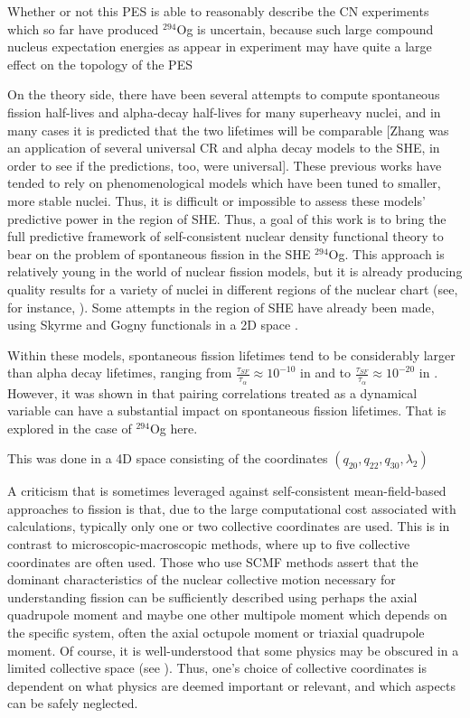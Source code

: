 Whether or not this PES is able to reasonably describe the CN experiments which so far have produced $^{294}$Og is uncertain, because such large compound nucleus expectation energies as appear in experiment may have quite a large effect on the topology of the PES \cite{Pei2009}

On the theory side, there have been several attempts to compute spontaneous fission half-lives and alpha-decay half-lives for many superheavy nuclei, and in many cases it is predicted that the two lifetimes will be comparable \cite{Poenaru2011, Poenaru2012, Zhang2018} [Zhang was an application of several universal CR and alpha decay models to the SHE, in order to see if the predictions, too, were universal]. These previous works have tended to rely on phenomenological models which have been tuned to smaller, more stable nuclei. Thus, it is difficult or impossible to assess these models' predictive power in the region of SHE. Thus, a goal of this work is to bring the full predictive framework of self-consistent nuclear density functional theory to bear on the problem of spontaneous fission in the SHE $^{294}$Og. This approach is relatively young in the world of nuclear fission models, but it is already producing quality results for a variety of nuclei in different regions of the nuclear chart (see, for instance, \cite{Mcdonnell2014, Sadhukhan2017, Sadhukhan2016, Tsekhanovich2018}). Some attempts in the region of SHE have already been made, using Skyrme and Gogny functionals in a 2D space \cite{Reinhard2017, Giuliani2017, Warda2012, Baran2015}.

Within these models, spontaneous fission lifetimes tend to be considerably larger than alpha decay lifetimes, ranging from $\frac{\tau_{SF}}{\tau_{\alpha}}\approx10^{-10}$ in \cite{Baran2015} and \cite{Reinhard2017} to $\frac{\tau_{SF}}{\tau_{\alpha}}\approx10^{-20}$ in \cite{Warda2012}. However, it was shown in \cite{Sadhukhan2014} that pairing correlations treated as a dynamical variable can have a substantial impact on spontaneous fission lifetimes. That is explored in the case of $^{294}$Og here.

This was done in a 4D space consisting of the coordinates $(q_{20}, q_{22}, q_{30}, \lambda_2)$

A criticism that is sometimes leveraged against self-consistent mean-field-based approaches to fission is that, due to the large computational cost associated with calculations, typically only one or two collective coordinates are used. This is in contrast to microscopic-macroscopic methods, where up to five collective coordinates are often used. Those who use SCMF methods assert that the dominant characteristics of the nuclear collective motion necessary for understanding fission can be sufficiently described using perhaps the axial quadrupole moment and maybe one other multipole moment which depends on the specific system, often the axial octupole moment or triaxial quadrupole moment. Of course, it is well-understood that some physics may be obscured in a limited collective space (see \cite{Dubray2012}). Thus, one's choice of collective coordinates is dependent on what physics are deemed important or relevant, and which aspects can be safely neglected.

